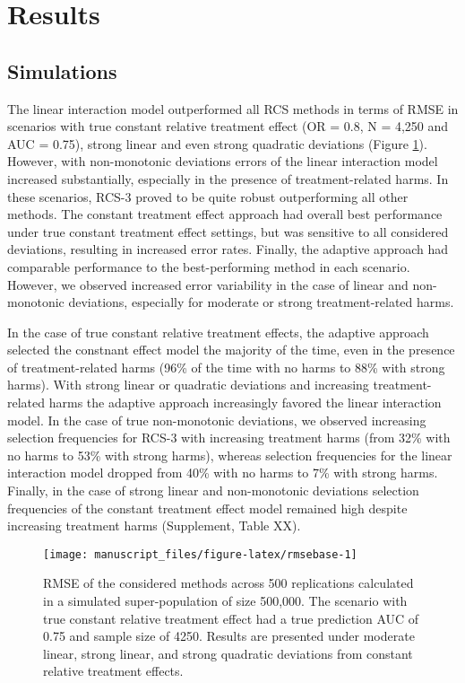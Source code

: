\documentclass{article}
\begin{document}
\hypertarget{results}{%
\section{Results}\label{results}}

\hypertarget{simulations}{%
\subsection{Simulations}\label{simulations}}

The linear interaction model outperformed all RCS methods in terms of
RMSE in scenarios with true constant relative treatment effect (OR =
0.8, N = 4,250 and AUC = 0.75), strong linear and even strong quadratic
deviations (Figure \ref{fig:rmsebase}). However, with non-monotonic
deviations errors of the linear interaction model increased
substantially, especially in the presence of treatment-related harms. In
these scenarios, RCS-3 proved to be quite robust outperforming all other
methods. The constant treatment effect approach had overall best
performance under true constant treatment effect settings, but was
sensitive to all considered deviations, resulting in increased error
rates. Finally, the adaptive approach had comparable performance to the
best-performing method in each scenario. However, we observed increased
error variability in the case of linear and non-monotonic deviations,
especially for moderate or strong treatment-related harms.

In the case of true constant relative treatment effects, the adaptive
approach selected the constnant effect model the majority of the time,
even in the presence of treatment-related harms (96\% of the time with
no harms to 88\% with strong harms). With strong linear or quadratic
deviations and increasing treatment-related harms the adaptive approach
increasingly favored the linear interaction model. In the case of true
non-monotonic deviations, we observed increasing selection frequencies
for RCS-3 with increasing treatment harms (from 32\% with no harms to
53\% with strong harms), whereas selection frequencies for the linear
interaction model dropped from 40\% with no harms to 7\% with strong
harms. Finally, in the case of strong linear and non-monotonic
deviations selection frequencies of the constant treatment effect model
remained high despite increasing treatment harms (Supplement, Table XX).

\begin{figure}
\texttt{[image: manuscript\_files/figure-latex/rmsebase-1]} \caption{RMSE of the considered methods across 500 replications calculated in a simulated super-population of size 500,000. The scenario with true constant relative treatment effect had a true prediction AUC of 0.75 and sample size of 4250. Results are presented under moderate linear, strong linear, and strong quadratic deviations from constant relative treatment effects.}\label{fig:rmsebase}
\end{figure}
\end{document}
